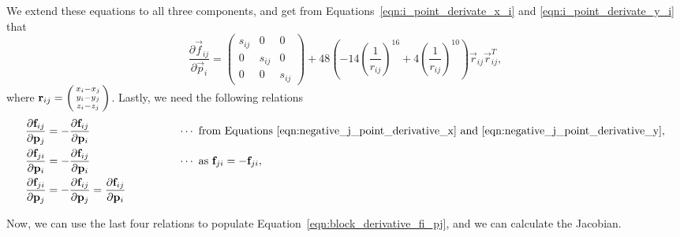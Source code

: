 \documentclass[../Main.tex]{subfiles}
\begin{document}
We extend these equations to all three components, and get from Equations~\ref{eqn:i_point_derivate_x_i} and \ref{eqn:i_point_derivate_y_i} that 
$$
\renewcommand\arraystretch{1.5}
\frac{\partial \vec{f}_{ij}}{\partial \vec{p}_{i}} = 
	\begin{pmatrix}
		s_{ij} & 0 & 0 \\
		0 & s_{ij} & 0 \\
		0 & 0 & s_{ij}
	\end{pmatrix} + 48\left(-14\left(\frac{1}{r_{ij}}\right)^{16}+ 4\left(\frac{1}{r_{ij}}\right)^{10}\right)\vec{r}_{ij}\vec{r}_{ij}^{T},
$$ where $\vec{r}_{ij} = \begin{psmallmatrix} x_{i} - x_{j} \\ y_{i} - y{_j} \\ z_{i} - z_{j}\end{psmallmatrix}$.
Lastly, we need the following relations
\begin{align*}
\frac{\partial \vec{f}_{ij}}{\partial \vec{p}_{j}} &= -\frac{\partial \vec{f}_{ij}}{\partial \vec{p}_{i}} \qquad \qquad \qquad \qquad\cdots \mbox{  from Equations \ref{eqn:negative_j_point_derivative_x} and \ref{eqn:negative_j_point_derivative_y}}, \\
\frac{\partial \vec{f}_{ji}}{\partial \vec{p}_{i}} &= -\frac{\partial \vec{f}_{ij}}{\partial \vec{p}_{i}} \qquad \qquad \qquad \qquad\cdots \mbox{  as } \vec{f}_{ji} = -\vec{f}_{ji}, \\
\frac{\partial \vec{f}_{ji}}{\partial \vec{p}_{j}} &= -\frac{\partial \vec{f}_{ij}}{\partial \vec{p}_{j}} = \frac{\partial \vec{f}_{ij}}{\partial \vec{p}_{i}}
\end{align*}

Now, we can use the last four relations to populate Equation~\ref{eqn:block_derivative_fi_pj}, and we can calculate the Jacobian.
\end{document}
